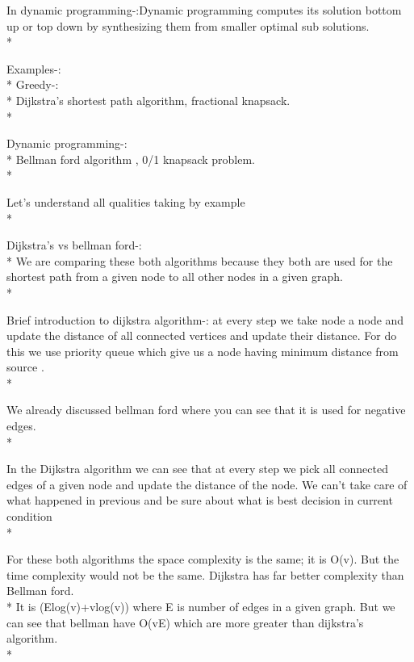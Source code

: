\documentclass[12pt]{book}
\begin{document}
In dynamic programming-:Dynamic programming computes its solution bottom up or top down by synthesizing them from smaller optimal sub solutions.\\*

Examples-: \\* 
Greedy-:\\*
Dijkstra’s shortest path algorithm, fractional knapsack.\\*

Dynamic programming-:\\*
Bellman ford algorithm , 0/1 knapsack problem.\\*

Let’s understand all qualities taking by example\\*

Dijkstra’s vs bellman ford-:\\*
We are comparing these both algorithms because they both are used for the shortest path from a given node to all other nodes in a given graph.\\*

 Brief introduction to dijkstra algorithm-: at every step we take node a node and update the distance of all connected vertices and update their distance. For do this we use priority queue which give us a node having minimum distance from source .\\*

We already discussed bellman ford where you can see that it is used for negative edges. \\*

In the Dijkstra algorithm we can see that at every step we pick all connected edges of a given node and update the distance of the node. We can’t take care of what happened in previous and be sure about what is best decision in current condition\\*

For  these both algorithms the space complexity is the same; it is O(v).
But the time complexity would not be the same. Dijkstra has far better complexity than Bellman ford.\\*
\newline
It is (Elog(v)+vlog(v)) where E is number of edges in a given graph.
But we can see that bellman have O(vE) which are more greater than dijkstra’s algorithm. \\*
\end{document}
